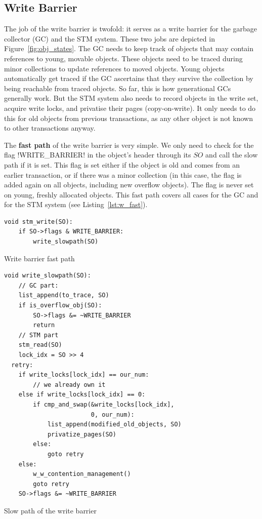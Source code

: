 \documentclass{sigplanconf}
\makeatletter
\renewcommand\lstinline[1][]{%
  \Collectverb{\@@myverb}%
}
\def\@@myverb#1{%
    \begingroup
    \fboxsep=0.2em
    \colorbox{verylightgray}{\oldlstinline|#1|}%
    \endgroup
}
\makeatother
\begin{document}
\subsection{Write Barrier}

The job of the write barrier is twofold: it serves as a write barrier
for the garbage collector (GC) and the STM system. These two jobs are
depicted in Figure~\ref{fig:obj_states}. The GC needs to keep track of
objects that may contain references to young, movable objects. These
objects need to be traced during minor collections to update
references to moved objects. Young objects automatically get traced if
the GC ascertains that they survive the collection by being reachable
from traced objects. So far, this is how generational GCs generally
work. But the STM system also needs to record objects in the
write set, acquire write locks, and privatise their pages
(copy-on-write). It only needs to do this for old objects from
previous transactions, as any other object is not known to other
transactions anyway.

The \textbf{fast path} of the write barrier is very simple. We only
need to check for the flag \lstinline!WRITE_BARRIER! in the object's
header through its $SO$ and call the slow path if it is set. This flag
is set either if the object is old and comes from an earlier
transaction, or if there was a minor collection (in this case, the flag
is added again on all objects, including new overflow objects). The flag
is never set on young, freshly allocated objects. This fast path
covers all cases for the GC and for the STM system (see
Listing~\ref{lst:w_fast}).

\begin{code}[h]
\begin{lstlisting}
void stm_write(SO):
	if SO->flags & WRITE_BARRIER:
		write_slowpath(SO)
\end{lstlisting}
\caption{Write barrier fast path\label{lst:w_fast}}
\end{code}

\begin{code}[h]
\begin{lstlisting}
void write_slowpath(SO):
	// GC part:
	list_append(to_trace, SO)
	if is_overflow_obj(SO):
		SO->flags &= ~WRITE_BARRIER
		return
	// STM part
	stm_read(SO)
	lock_idx = SO >> 4
  retry:
	if write_locks[lock_idx] == our_num:
		// we already own it
	else if write_locks[lock_idx] == 0:
		if cmp_and_swap(&write_locks[lock_idx],
					    0, our_num):
			list_append(modified_old_objects, SO)
			privatize_pages(SO)
		else:
			goto retry
	else:
		w_w_contention_management()
		goto retry
	SO->flags &= ~WRITE_BARRIER
\end{lstlisting}

\caption{Slow path of the write barrier\label{lst:w_slow}}
\end{code}
\end{document}
